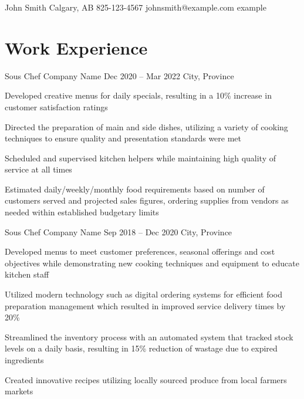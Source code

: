\documentclass[letterpaper]{resume_config}
\begin{document}
\Header
    {John Smith} %
    {Calgary, AB} %
    {825-123-4567} %
    {johnsmith@example.com} %
    {example} %


\section{Work Experience}

\WorkExperience
    {Sous Chef} %
    {Company Name} %
    {Dec 2020 -- Mar 2022} %
    {City, Province} %
    {
        \item Developed creative menus for daily specials, resulting in a 10\% increase in customer satisfaction ratings
        \item Directed the preparation of main and side dishes, utilizing a variety of cooking techniques to ensure quality and presentation standards were met
        \item Scheduled and supervised kitchen helpers while maintaining high quality of service at all times
        \item Estimated daily/weekly/monthly food requirements based on number of customers served and projected sales figures, ordering supplies from vendors as needed within established budgetary limits
    } 

\WorkExperience
    {Sous Chef} %
    {Company Name} %
    {Sep 2018 -- Dec 2020} %
    {City, Province} %
    {
        \item Developed menus to meet customer preferences, seasonal offerings and cost objectives while demonstrating new cooking techniques and equipment to educate kitchen staff
        \item Utilized modern technology such as digital ordering systems for efficient food preparation management which resulted in improved service delivery times by 20\%
        \item Streamlined the inventory process with an automated system that tracked stock levels on a daily basis, resulting in 15\% reduction of wastage due to expired ingredients
        \item Created innovative recipes utilizing locally sourced produce from local farmers markets
    }
\end{document}
